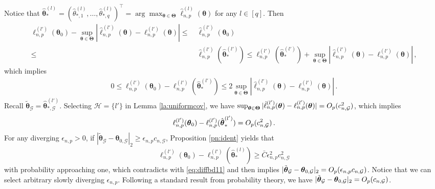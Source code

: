 \documentclass[10pt,a4paper]{amsart}
\theoremstyle{plain}
\theoremstyle{remark}
\newcommand{\btheta}{\boldsymbol \theta}
\newcommand{\bTheta}{\boldsymbol \Theta}
\def\T{{\scriptscriptstyle \top} }
\begin{document}
Notice that $
\hat{\btheta}_*^{(l)}=(\hat \theta_{*,1}^{(l)}, \dots,\hat \theta_{*,q}^{(l)} )^{\T}=\arg\max_{\btheta\in\bTheta}\hat{\ell}_{n,p}^{(l)}(\btheta)$ for any $l\in[q]$. Then
\begin{align*}
{\ell}_{n,p}^{(l')}(\btheta_0)-\sup_{\btheta\in\bTheta}|\hat{\ell}_{n,p}^{(l')}(\btheta)-{\ell}_{n,p}^{(l')}(\btheta)|\leq&~\hat{\ell}_{n,p}^{(l')}(\btheta_0)\\
\leq&~\hat{\ell}_{n,p}^{(l')}(\hat{\btheta}_*^{(l')})\leq {\ell}_{n,p}^{(l')}(\hat{\btheta}_*^{(l')})+\sup_{\btheta\in\bTheta}|\hat{\ell}_{n,p}^{(l')}(\btheta)-{\ell}_{n,p}^{(l')}(\btheta)|\,,
\end{align*}
which implies
\begin{align*}%
0\leq {\ell}_{n,p}^{(l')}(\btheta_0)-{\ell}_{n,p}^{(l')}(\hat{\btheta}_*^{(l')})\leq 2\sup_{\btheta\in\bTheta}|\hat{\ell}_{n,p}^{(l')}(\btheta)-{\ell}_{n,p}^{(l')}(\btheta)|\,.
\end{align*}
Recall $\tilde{\btheta}_{\mathcal{G}}=\hat{\btheta}_{*,\mathcal{G}}^{(l')}$. Selecting $\mathcal{H}=\{l'\}$ in Lemma \ref{la:uniformcov}, we have $\sup_{\btheta\in\bTheta}|\hat{\ell}_{n,p}^{(l')}(\btheta)-{\ell}_{n,p}^{(l')}(\btheta)|=O_{\rm p}(c_{n,\mathcal{G}}^2)$, which implies 
\begin{align}\label{eq:diffbd11}
{\ell}_{n,p}^{(l')}(\btheta_0)-{\ell}_{n,p}^{(l')}(\hat{\btheta}_*^{(l')})=O_{\rm p}(c_{n,\mathcal{G}}^2)\,.
\end{align}
For any diverging $\epsilon_{n,p}>0$, if $|\tilde{\btheta}_{\mathcal{G}}-\btheta_{0,\mathcal{G}}|_2\geq \epsilon_{n,p}c_{n,\mathcal{G}}$, Proposition \ref{pn:ident} yields that
\[
{\ell}_{n,p}^{(l')}(\btheta_0)-{\ell}_{n,p}^{(l')}(\hat{\btheta}_*^{(l)})\geq\bar{C}\epsilon_{n,p}^2c_{n,\mathcal{G}}^2 
\]
with probability approaching one, which contradicts with \eqref{eq:diffbd11} and then implies $|\tilde{\btheta}_{\mathcal{G}}-\btheta_{0,\mathcal{G}}|_2=O_{\rm p}( \epsilon_{n,p}c_{n,\mathcal{G}})$. Notice that we can select arbitrary slowly diverging $\epsilon_{n,p}$. Following a standard result from
probability theory, we have $|\tilde{\btheta}_{\mathcal{G}}-\btheta_{0,\mathcal{G}}|_2=O_{\rm p}(c_{n,\mathcal{G}})$. 
\end{document}
